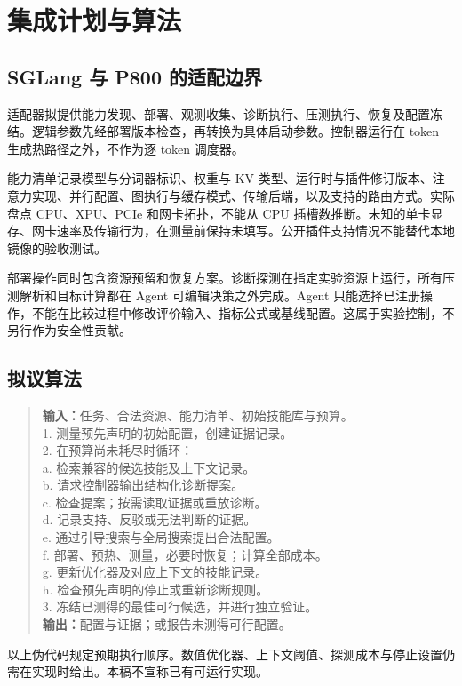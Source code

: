 \documentclass[UTF8,11pt,a4paper,fontset=windows]{ctexart}
\begin{document}
\section{集成计划与算法}
\subsection{SGLang 与 P800 的适配边界}
适配器拟提供能力发现、部署、观测收集、诊断执行、压测执行、恢复及配置冻结。逻辑参数先经部署版本检查，再转换为具体启动参数。控制器运行在 token 生成热路径之外，不作为逐 token 调度器。

能力清单记录模型与分词器标识、权重与 KV 类型、运行时与插件修订版本、注意力实现、并行配置、图执行与缓存模式、传输后端，以及支持的路由方式。实际盘点 CPU、XPU、PCIe 和网卡拓扑，不能从 CPU 插槽数推断。未知的单卡显存、网卡速率及传输行为，在测量前保持未填写。公开插件支持情况不能替代本地镜像的验收测试。

部署操作同时包含资源预留和恢复方案。诊断探测在指定实验资源上运行，所有压测解析和目标计算都在 Agent 可编辑决策之外完成。Agent 只能选择已注册操作，不能在比较过程中修改评价输入、指标公式或基线配置。这属于实验控制，不另行作为安全性贡献。

\subsection{拟议算法}
\begin{quote}\small
\textbf{输入：}任务、合法资源、能力清单、初始技能库与预算。\\
1. 测量预先声明的初始配置，创建证据记录。\\
2. 在预算尚未耗尽时循环：\\
\hspace*{1em}a. 检索兼容的候选技能及上下文记录。\\
\hspace*{1em}b. 请求控制器输出结构化诊断提案。\\
\hspace*{1em}c. 检查提案；按需读取证据或重放诊断。\\
\hspace*{1em}d. 记录支持、反驳或无法判断的证据。\\
\hspace*{1em}e. 通过引导搜索与全局搜索提出合法配置。\\
\hspace*{1em}f. 部署、预热、测量，必要时恢复；计算全部成本。\\
\hspace*{1em}g. 更新优化器及对应上下文的技能记录。\\
\hspace*{1em}h. 检查预先声明的停止或重新诊断规则。\\
3. 冻结已测得的最佳可行候选，并进行独立验证。\\
\textbf{输出：}配置与证据；或报告未测得可行配置。
\end{quote}
以上伪代码规定预期执行顺序。数值优化器、上下文阈值、探测成本与停止设置仍需在实现时给出。本稿不宣称已有可运行实现。
\end{document}
